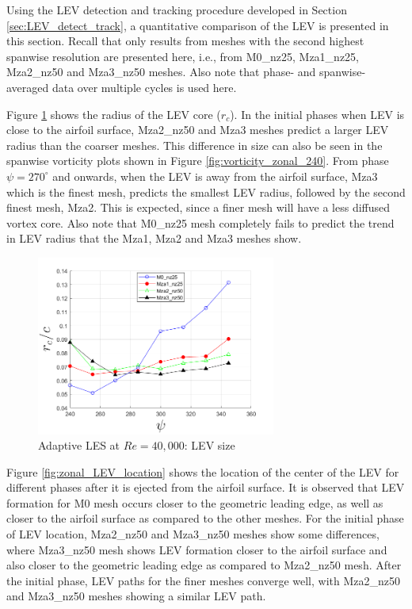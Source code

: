 Using the LEV detection and tracking procedure developed in Section \ref{sec:LEV_detect_track}, a quantitative comparison of the LEV is presented in this section. 
Recall that only results from meshes with the second highest spanwise resolution are presented here, i.e., from M0\_nz25, Mza1\_nz25, Mza2\_nz50 and Mza3\_nz50 meshes.
Also note that phase- and spanwise-averaged data over multiple cycles is used here.

Figure \ref{fig:zonal_LEV_radius} shows the radius of the LEV core ($r_c$).
In the initial phases when LEV is close to the airfoil surface, Mza2\_nz50 and Mza3 meshes predict a larger LEV radius than the coarser meshes. 
This difference in size can also be seen in the spanwise vorticity plots shown in Figure \ref{fig:vorticity_zonal_240}.
From phase $\psi = 270^\circ$ and onwards, when the LEV is away from the airfoil surface, Mza3 which is the finest mesh, predicts the smallest LEV radius, followed by the second finest mesh, Mza2. 
This is expected, since a finer mesh will have a less diffused vortex core. Also note that M0\_nz25 mesh completely fails to predict the trend in LEV radius that the Mza1, Mza2 and Mza3 meshes show.

\begin{figure}[H]
	\centering
	\includegraphics[width=0.7\textwidth]{figures/zonal_adapt_results/LEV/LEV_radius_vp}
	\caption{ Adaptive LES at $Re=40,000$: LEV size}
	\label{fig:zonal_LEV_radius}
\end{figure}

Figure \ref{fig:zonal_LEV_location} shows the location of the center of the LEV for different phases after it is ejected from the airfoil surface. 
It is observed that LEV formation for M0 mesh occurs closer to the geometric leading edge, as well as closer to the airfoil surface as compared to the other meshes.
For the initial phase of LEV location, Mza2\_nz50 and Mza3\_nz50 meshes show some differences, where Mza3\_nz50 mesh shows LEV formation closer to the airfoil surface and also closer to the geometric leading edge as compared to Mza2\_nz50 mesh.
After the initial phase, LEV paths for the finer meshes converge well, with Mza2\_nz50 and Mza3\_nz50 meshes showing a similar LEV path.


